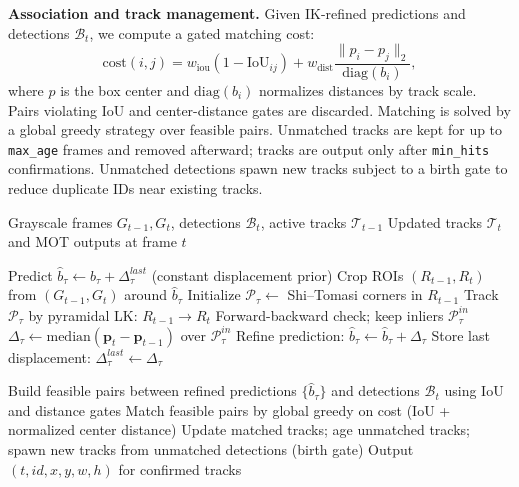 \textbf{Association and track management.}
Given IK-refined predictions and detections $\mathcal{B}_t$, we compute a gated matching cost:
\[
\text{cost}(i,j)=w_\text{iou}(1-\text{IoU}_{ij})
+ w_\text{dist}\frac{\|p_i-p_j\|_2}{\text{diag}(b_i)},
\]
where $p$ is the box center and $\text{diag}(b_i)$ normalizes distances by track scale.
Pairs violating IoU and center-distance gates are discarded.
Matching is solved by a global greedy strategy over feasible pairs.
Unmatched tracks are kept for up to \texttt{max\_age} frames and removed afterward; tracks are output only after \texttt{min\_hits} confirmations.
Unmatched detections spawn new tracks subject to a birth gate to reduce duplicate IDs near existing tracks.

\begin{algorithm}[t]
\small
\caption{Online tracking with IK (Iterative LK) refinement}
\label{alg:ik_tracker}
\begin{algorithmic}[1]
\REQUIRE Grayscale frames $G_{t-1}, G_t$, detections $\mathcal{B}_t$, active tracks $\mathcal{T}_{t-1}$
\ENSURE Updated tracks $\mathcal{T}_t$ and MOT outputs at frame $t$

    \STATE Predict $\hat{b}_\tau \leftarrow b_\tau + \Delta^{last}_\tau$ \hfill (constant displacement prior)
    \STATE Crop ROIs $(R_{t-1},R_t)$ from $(G_{t-1},G_t)$ around $\hat{b}_\tau$
        \STATE Initialize $\mathcal{P}_\tau \leftarrow$ Shi--Tomasi corners in $R_{t-1}$
    \ENDIF
    \STATE Track $\mathcal{P}_\tau$ by pyramidal LK: $R_{t-1}\rightarrow R_t$
    \STATE Forward-backward check; keep inliers $\mathcal{P}_\tau^{in}$
        \STATE $\Delta_\tau \leftarrow \mathrm{median}(\mathbf{p}_t-\mathbf{p}_{t-1})$ over $\mathcal{P}_\tau^{in}$
        \STATE Refine prediction: $\hat{b}_\tau \leftarrow \hat{b}_\tau + \Delta_\tau$
        \STATE Store last displacement: $\Delta^{last}_\tau \leftarrow \Delta_\tau$
    \ENDIF
\ENDFOR

\STATE Build feasible pairs between refined predictions $\{\hat{b}_\tau\}$ and detections $\mathcal{B}_t$ using IoU and distance gates
\STATE Match feasible pairs by global greedy on cost (IoU + normalized center distance)
\STATE Update matched tracks; age unmatched tracks; spawn new tracks from unmatched detections (birth gate)
\STATE Output $(t, id, x, y, w, h)$ for confirmed tracks
\end{algorithmic}
\end{algorithm}

